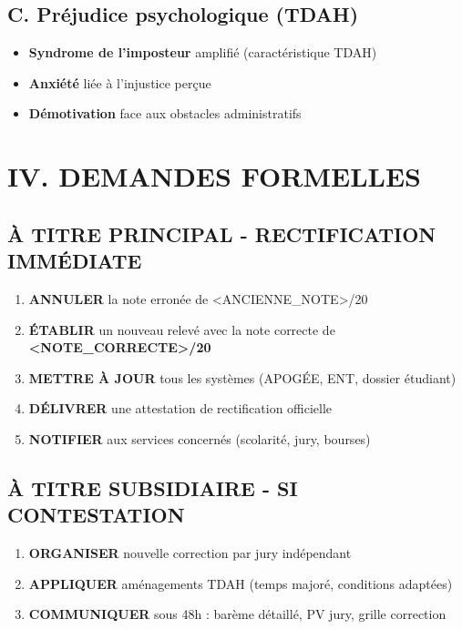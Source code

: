 \documentclass[12pt,french]{scrlttr2}
\begin{document}
\begin{letter}
\subsection*{C. Préjudice psychologique (TDAH)}
\begin{itemize}[leftmargin=*]
\item \textbf{Syndrome de l'imposteur} amplifié (caractéristique TDAH)
\item \textbf{Anxiété} liée à l'injustice perçue
\item \textbf{Démotivation} face aux obstacles administratifs
\end{itemize}

\section*{IV. DEMANDES FORMELLES}

\subsection*{\colorbox{green!20}{À TITRE PRINCIPAL - RECTIFICATION IMMÉDIATE}}

\begin{enumerate}
\item \textbf{ANNULER} la note erronée de <ANCIENNE_NOTE>/20
\item \textbf{ÉTABLIR} un nouveau relevé avec la note correcte de \colorbox{green!20}{\textbf{<NOTE_CORRECTE>/20}}
\item \textbf{METTRE À JOUR} tous les systèmes (APOGÉE, ENT, dossier étudiant)
\item \textbf{DÉLIVRER} une attestation de rectification officielle
\item \textbf{NOTIFIER} aux services concernés (scolarité, jury, bourses)
\end{enumerate}

\subsection*{\colorbox{yellow!20}{À TITRE SUBSIDIAIRE - SI CONTESTATION}}

\begin{enumerate}
\item \textbf{ORGANISER} nouvelle correction par jury indépendant
\item \textbf{APPLIQUER} aménagements TDAH (temps majoré, conditions adaptées)
\item \textbf{COMMUNIQUER} sous 48h : barème détaillé, PV jury, grille correction
\end{enumerate}


\end{letter}
\end{document}
